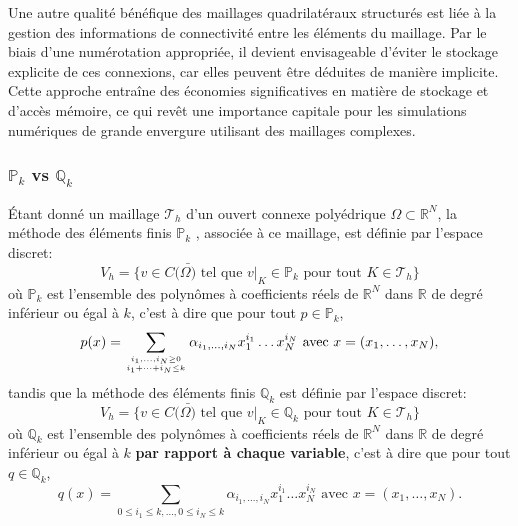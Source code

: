 Une autre qualité bénéfique des maillages quadrilatéraux structurés est liée à la gestion des informations de connectivité entre les éléments du maillage. Par le biais d'une numérotation appropriée, il devient envisageable d'éviter le stockage explicite de ces connexions, car elles peuvent être déduites de manière implicite. Cette approche entraîne des économies significatives en matière de stockage et d'accès mémoire, ce qui revêt une importance capitale pour les simulations numériques de grande envergure utilisant des maillages complexes.


\subsubsection{$\mathbb{P}_k$ vs $\mathbb{Q}_k$}

\'Etant donné un maillage $\mathcal{T}_h$ d'un ouvert connexe polyédrique $\Omega\subset\mathbb{R}^N$, la méthode des éléments finis $\mathbb{P}_k$ \cite{allaire2005analyse}, associée à ce maillage, est définie par l'espace discret:
$$V_h=\{v\in C(\bar{\Omega)}\text{ tel que }v|_{K}\in\mathbb{P}_k\text{ pour tout }K\in\mathcal{T}_h\}$$
où $\mathbb{P}_k$ est l'ensemble des polynômes à coefficients réels de $\mathbb{R}^N$ dans $\mathbb{R}$ de degré inférieur ou égal à $k$, c'est à dire que pour tout $p\in\mathbb{P}_k$,
$$p(x)=\displaystyle\sum_{i_1,\dots, i_N\geq 0\atop i_1+\dots+i_N\leq k}\alpha_{i_1,\dots,i_N}x_1^{i_1}\dots x_N^{i_N}\text{ avec }x=(x_1,\dots,x_N),$$
tandis que la méthode des éléments finis $\mathbb{Q}_k$ est définie par l'espace discret:
$$V_h=\{v\in C(\bar{\Omega)}\text{ tel que }v|_{K}\in\mathbb{Q}_k\text{ pour tout }K\in\mathcal{T}_h\}$$
où $\mathbb{Q}_k$ est l'ensemble des polynômes à coefficients réels de $\mathbb{R}^N$ dans $\mathbb{R}$ de degré inférieur ou égal à $k$ \textbf{par rapport à chaque variable}, c'est à dire que pour tout $q\in\mathbb{Q}_k$,
$$q(x)=\displaystyle\sum_{0\leq i_1\leq k,\dots,0\leq i_N\leq k}\alpha_{i_1,\dots,i_N}x_1^{i_1}\dots x_N^{i_N}\text{ avec }x=(x_1,\dots,x_N).$$

